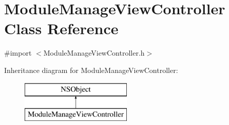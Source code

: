 \hypertarget{interface_module_manage_view_controller}{\section{Module\-Manage\-View\-Controller Class Reference}
\label{interface_module_manage_view_controller}
}


{\ttfamily \#import $<$Module\-Manage\-View\-Controller.\-h$>$}

Inheritance diagram for Module\-Manage\-View\-Controller\-:\begin{figure}[H]
\begin{center}
\leavevmode
\includegraphics[height=2.000000cm]{interface_module_manage_view_controller}
\end{center}
\end{figure}
